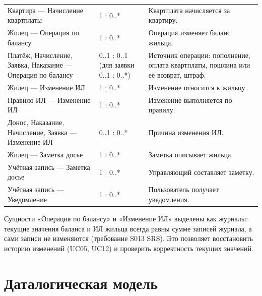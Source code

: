 \documentclass[12pt,a4paper]{article}
\begin{document}
\begin{longtable}{L{45.1mm} L{32.3mm} L{79.4mm}}
Квартира — Начисление квартплаты & 1 : 0..* & Квартплата начисляется за квартиру. \\
Жилец — Операция по балансу & 1 : 0..* & Операция изменяет баланс жильца. \\
Платёж, Начисление, Заявка, Наказание — Операция по балансу & 0..1 : 0..1 (для заявки 0..1 : 0..*) & Источник операции: пополнение, оплата квартплаты, пошлина или её возврат, штраф. \\
Жилец — Изменение ИЛ & 1 : 0..* & Изменение относится к жильцу. \\
Правило ИЛ — Изменение ИЛ & 1 : 0..* & Изменение выполняется по правилу. \\
Донос, Наказание, Начисление, Заявка — Изменение ИЛ & 0..1 : 0..* & Причина изменения ИЛ. \\
Жилец — Заметка досье & 1 : 0..* & Заметка описывает жильца. \\
Учётная запись — Заметка досье & 1 : 0..* & Управляющий составляет заметку. \\
Учётная запись — Уведомление & 1 : 0..* & Пользователь получает уведомления. \\
\end{longtable}
Сущности «Операция по балансу» и «Изменение ИЛ» выделены как журналы: текущие значения
баланса и ИЛ жильца всегда равны сумме записей журнала, а сами записи не изменяются (требование
S013 SRS). Это позволяет восстановить историю изменений (UC05, UC12) и проверить корректность
текущих значений.

\section{Даталогическая модель}\label{sec:datalogical}
\end{document}
